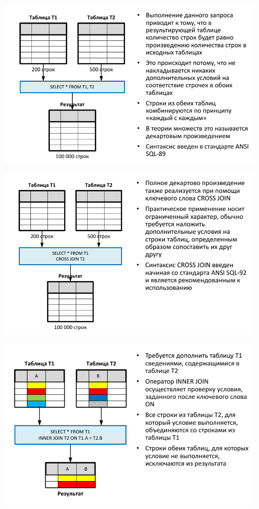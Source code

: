 \documentclass{beamer}
\begin{document}
\begin{frame}
\begin{center}
\includegraphics[scale=0.5]{images/cs-01.png}
\end{center}
\end{frame} 

\begin{frame}
\begin{center}
\includegraphics[scale=0.5]{images/cs-02.png}
\end{center}
\end{frame} 

\begin{frame}
\begin{center}
\includegraphics[scale=0.5]{images/cs-03.png}
\end{center}
\end{frame} 
\end{document}
